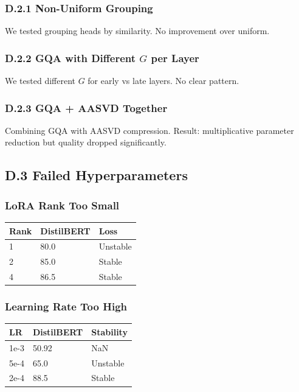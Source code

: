 \subsubsection{D.2.1 Non-Uniform Grouping}

We tested grouping heads by similarity. No improvement over uniform.

\subsubsection{D.2.2 GQA with Different $G$ per Layer}

We tested different $G$ for early vs late layers. No clear pattern.

\subsubsection{D.2.3 GQA + AASVD Together}

Combining GQA with AASVD compression. Result: multiplicative parameter 
reduction but quality dropped significantly.

\subsection{D.3 Failed Hyperparameters}

\subsubsection{LoRA Rank Too Small}

\begin{table}[H]
\centering
\small
\begin{tabular}{lll}
\toprule
\textbf{Rank} & \textbf{DistilBERT} & \textbf{Loss} \\
\midrule
1 & 80.0 & Unstable \\
2 & 85.0 & Stable \\
4 & 86.5 & Stable \\
\bottomrule
\end{tabular}
\end{table}

\subsubsection{Learning Rate Too High}

\begin{table}[H]
\centering
\small
\begin{tabular}{lll}
\toprule
\textbf{LR} & \textbf{DistilBERT} & \textbf{Stability} \\
\midrule
1e-3 & 50.92 & NaN \\
5e-4 & 65.0 & Unstable \\
2e-4 & 88.5 & Stable \\
\bottomrule
\end{tabular}
\end{table}

